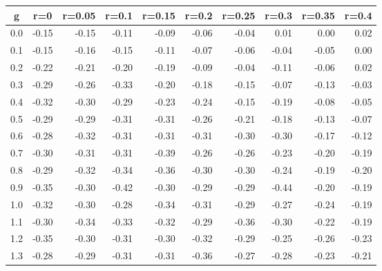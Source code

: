 %
\begin{table}[!tbp]
 \begin{center}
 \begin{tabular}{rrrrrrrrrr}\hline\hline
\multicolumn{1}{c}{g}&\multicolumn{1}{c}{r=0}&\multicolumn{1}{c}{r=0.05}&\multicolumn{1}{c}{r=0.1}&\multicolumn{1}{c}{r=0.15}&\multicolumn{1}{c}{r=0.2}&\multicolumn{1}{c}{r=0.25}&\multicolumn{1}{c}{r=0.3}&\multicolumn{1}{c}{r=0.35}&\multicolumn{1}{c}{r=0.4}\tabularnewline
\hline
0.0&-0.15&-0.15&-0.11&-0.09&-0.06&-0.04& 0.01& 0.00& 0.02\tabularnewline
0.1&-0.15&-0.16&-0.15&-0.11&-0.07&-0.06&-0.04&-0.05& 0.00\tabularnewline
0.2&-0.22&-0.21&-0.20&-0.19&-0.09&-0.04&-0.11&-0.06& 0.02\tabularnewline
0.3&-0.29&-0.26&-0.33&-0.20&-0.18&-0.15&-0.07&-0.13&-0.03\tabularnewline
0.4&-0.32&-0.30&-0.29&-0.23&-0.24&-0.15&-0.19&-0.08&-0.05\tabularnewline
0.5&-0.29&-0.29&-0.31&-0.31&-0.26&-0.21&-0.18&-0.13&-0.07\tabularnewline
0.6&-0.28&-0.32&-0.31&-0.31&-0.31&-0.30&-0.30&-0.17&-0.12\tabularnewline
0.7&-0.30&-0.31&-0.31&-0.39&-0.26&-0.26&-0.23&-0.20&-0.19\tabularnewline
0.8&-0.29&-0.32&-0.34&-0.36&-0.30&-0.30&-0.24&-0.19&-0.20\tabularnewline
0.9&-0.35&-0.30&-0.42&-0.30&-0.29&-0.29&-0.44&-0.20&-0.19\tabularnewline
1.0&-0.32&-0.30&-0.28&-0.34&-0.31&-0.29&-0.27&-0.24&-0.19\tabularnewline
1.1&-0.30&-0.34&-0.33&-0.32&-0.29&-0.36&-0.30&-0.22&-0.19\tabularnewline
1.2&-0.35&-0.30&-0.31&-0.30&-0.32&-0.29&-0.25&-0.26&-0.23\tabularnewline
1.3&-0.28&-0.29&-0.31&-0.31&-0.36&-0.27&-0.28&-0.23&-0.21\tabularnewline
\hline
\end{tabular}

\end{center}

\end{table}


